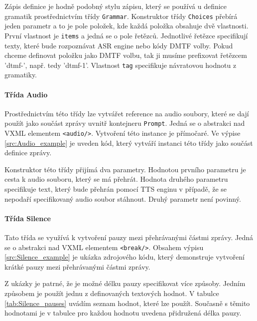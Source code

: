 \documentclass[ing,male,java,dept460]{diploma}						%
\begin{document}


Zápis definice je hodně podobný stylu zápisu, který se používá u definice gramatik prostřednictvím třídy \texttt{Grammar}. Konstruktor třídy \texttt{Choices} přebírá jeden parametr a to je pole položek, kde každá položka obsahuje dvě vlastnosti. První vlastnost je \texttt{items} a jedná se o pole řetězců. Jednotlivé řetězce specifikují texty, které bude rozpoznávat ASR engine nebo kódy DMTF volby. Pokud chceme definovat položku jako DMTF volbu, tak ji musíme prefixovat řetězcem 'dtmf-', např. tedy 'dtmf-1'. Vlastnost \texttt{tag} specifikuje návratovou hodnotu z gramatiky.

\paragraph{Třída Audio}
\label{sec:Audio}
Prostřednictvím této třídy lze vytvářet reference na audio soubory, které se dají použít jako součást zprávy uvnitř kontejneru \texttt{Prompt}. Jedná se o abstrakci nad VXML elementem \texttt{<audio/>}. Vytvoření této instance je přímočaré. Ve výpise \ref{src:Audio_example} je uveden kód, který vytváří instanci této třídy jako součást definice zprávy.



Konstruktor této třídy přijímá dva parametry. Hodnotou prvního parametru je cesta k audio souboru, který se má přehrát. Hodnota druhého parametru specifikuje text, který bude přehrán pomocí TTS enginu v případě, že se nepodaří specifikovaný audio soubor stáhnout. Druhý parametr není povinný.

\paragraph{Třída Silence}
\label{sec:Silence}
Tato třída se využívá k vytvoření pauzy mezi přehrávanými částmi zprávy. Jedná se o abstrakci nad VXML elementem \texttt{<break/>}. Obsahem výpisu \ref{src:Silence_example} je ukázka zdrojového kódu, který demonstruje vytvoření krátké pauzy mezi přehrávanými částmi zprávy.

Z ukázky je patrné, že je možné délku pauzy specifikovat více způsoby. Jedním způsobem je použít jednu z definovaných textových hodnot. V tabulce \ref{tab:Silence_pauses} uvádím seznam hodnot, které lze použít. Současně s těmito hodnotami je v tabulce pro každou hodnotu uvedena přidružená délka pauzy\cite{vxml_org}.
\end{document}
